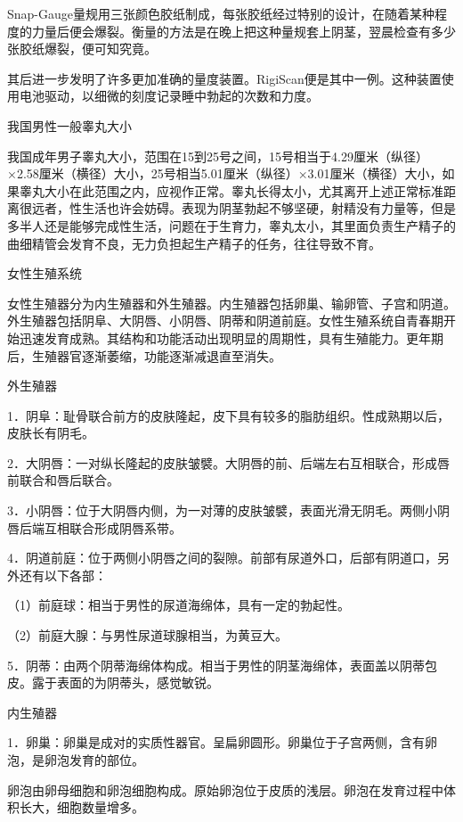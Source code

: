 \documentclass[12pt,UTF8]{ctexbook}
\begin{document}
Snap-Gauge量规用三张颜色胶纸制成，每张胶纸经过特别的设计，在随着某种程度的力量后便会爆裂。衡量的方法是在晚上把这种量规套上阴茎，翌晨检查有多少张胶纸爆裂，便可知究竟。

其后进一步发明了许多更加准确的量度装置。RigiScan便是其中一例。这种装置使用电池驱动，以细微的刻度记录睡中勃起的次数和力度。





我国男性一般睾丸大小


我国成年男子睾丸大小，范围在15到25号之间，15号相当于4.29厘米（纵径）×2.58厘米（横径）大小，25号相当5.01厘米（纵径）×3.01厘米（横径）大小，如果睾丸大小在此范围之内，应视作正常。睾丸长得太小，尤其离开上述正常标准距离很远者，性生活也许会妨碍。表现为阴茎勃起不够坚硬，射精没有力量等，但是多半人还是能够完成性生活，问题在于生育力，睾丸太小，其里面负责生产精子的曲细精管会发育不良，无力负担起生产精子的任务，往往导致不育。





女性生殖系统


女性生殖器分为内生殖器和外生殖器。内生殖器包括卵巢、输卵管、子宫和阴道。外生殖器包括阴阜、大阴唇、小阴唇、阴蒂和阴道前庭。女性生殖系统自青春期开始迅速发育成熟。其结构和功能活动出现明显的周期性，具有生殖能力。更年期后，生殖器官逐渐萎缩，功能逐渐减退直至消失。

外生殖器

1．阴阜：耻骨联合前方的皮肤隆起，皮下具有较多的脂肪组织。性成熟期以后，皮肤长有阴毛。

2．大阴唇：一对纵长隆起的皮肤皱襞。大阴唇的前、后端左右互相联合，形成唇前联合和唇后联合。

3．小阴唇：位于大阴唇内侧，为一对薄的皮肤皱襞，表面光滑无阴毛。两侧小阴唇后端互相联合形成阴唇系带。

4．阴道前庭：位于两侧小阴唇之间的裂隙。前部有尿道外口，后部有阴道口，另外还有以下各部：

（1）前庭球：相当于男性的尿道海绵体，具有一定的勃起性。

（2）前庭大腺：与男性尿道球腺相当，为黄豆大。

5．阴蒂：由两个阴蒂海绵体构成。相当于男性的阴茎海绵体，表面盖以阴蒂包皮。露于表面的为阴蒂头，感觉敏锐。

内生殖器

1．卵巢：卵巢是成对的实质性器官。呈扁卵圆形。卵巢位于子宫两侧，含有卵泡，是卵泡发育的部位。

卵泡由卵母细胞和卵泡细胞构成。原始卵泡位于皮质的浅层。卵泡在发育过程中体积长大，细胞数量增多。
\end{document}
